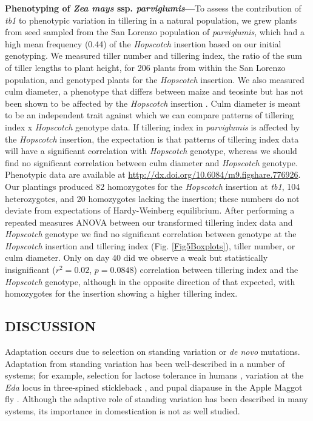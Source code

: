 \documentclass[11pt]{article} %
\begin{document}
\begin{linenumbers}
\begin{flushleft}
\textbf{Phenotyping of \emph{Zea mays} ssp. \emph{parviglumis}---}To assess the contribution of \emph{tb1} to phenotypic variation in tillering in a natural population, we grew plants from seed sampled from the San Lorenzo population of \emph{parviglumis}, which had a high mean frequency (0.44) of the \emph{Hopscotch} insertion based on our initial genotyping. 
We measured tiller number and tillering index, the ratio of the sum of tiller lengths to plant height, for 206 plants from within the San Lorenzo population, and genotyped plants for the \emph{Hopscotch} insertion. 
We also measured culm diameter, a phenotype that differs between maize and teosinte but has not been shown to be affected by the \emph{Hopscotch} insertion \citep{Briggs2007}. Culm diameter is meant to be an independent trait against which we can compare patterns of tillering index x \emph{Hopscotch} genotype data. If tillering index in \emph{parviglumis} is affected by the \emph{Hopscotch} insertion, the expectation is that patterns of tillering index data will have a significant correlation with \emph{Hopscotch} genotype, whereas we should find no significant correlation between culm diameter and \emph{Hopscotch} genotype. 
Phenotypic data are available at \url{http://dx.doi.org/10.6084/m9.figshare.776926}. 
Our plantings produced 82 homozygotes for the \emph{Hopscotch} insertion at \emph{tb1}, 104 heterozygotes, and 20 homozygotes lacking the insertion; these numbers do not deviate from expectations of Hardy-Weinberg equilibrium. 
After performing a repeated measures ANOVA between our transformed tillering index data and \emph{Hopscotch} genotype we find no significant correlation between genotype at the \emph{Hopscotch} insertion and tillering index (Fig. \ref{Fig5Boxplots}), tiller number, or culm diameter. 
Only on day 40 did we observe a weak but statistically insignificant ($r^2= 0.02$, $p=0.0848$) correlation between tillering index and the \emph{Hopscotch} genotype, although in the opposite direction of that expected, with homozygotes for the insertion showing a higher tillering index.

\begin{centering}
\section*{DISCUSSION}
\end{centering}

Adaptation occurs due to selection on standing variation or \emph{de novo} mutations. Adaptation from standing variation has been well-described in a number of systems; for example, selection for lactose tolerance in humans \citep{Plantinga2012, Tishkoff2007}, variation at the \emph{Eda} locus in three-spined stickleback \citep{Kitano2008, Colosimo2005}, and pupal diapause in the Apple Maggot fly \citep{Feder2003}. Although the adaptive role of standing variation has been described in many systems, its importance in domestication is not as well studied. 


\end{flushleft}
\end{linenumbers}
\end{document}
